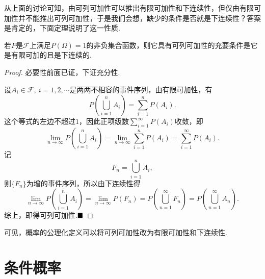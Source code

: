 从上面的讨论可知，由可列可加性可以推出有限可加性和下连续性，但仅由有限可加性并不能推出可列可加性，于是我们会想，缺少的条件是否就是下连续性？答案是肯定的，下面定理说明了这一性质.
\begin{theorem}
	若$P$是$\mathscr{F}$上满足$P(\varOmega)=1$的非负集合函数，则它具有可列可加性的充要条件是它是有限可加的且是下连续的.
\end{theorem}
\begin{proof}
	必要性前面已证，下证充分性.
	
	设$A_i\in\mathscr{F},\ i=1,2,\cdots$是两两不相容的事件序列，由有限可加性，有
	$$P\left(\bigcup_{i=1}^{n}A_i\right)=\sum_{i=1}^{n}P(A_i).$$
	这个等式的左边不超过$1$，因此正项级数$\sum\limits_{i=1}^{\infty}P(A_i)$收敛，即
	$$\lim\limits_{n\to\infty}P\left(\bigcup_{i=1}^{n}A_i\right)=\lim\limits_{n\to\infty}\sum_{i=1}^{n}P(A_i)=\sum_{i=1}^{\infty}P(A_i).$$
	记
	$$F_n=\bigcup_{i=1}^{n}A_i,$$
	则$\{F_n\}$为增的事件序列，所以由下连续性得
	$$\lim\limits_{n\to\infty}P\left(\bigcup_{i=1}^{n}A_i\right)=\lim\limits_{n\to\infty}P(F_n)=P\left(\bigcup_{n=1}^{\infty}F_n\right)=P\left(\bigcup_{n=1}^{\infty}A_n\right).$$
	综上，即得可列可加性.$\hfill\blacksquare$
\end{proof}
可见，概率的公理化定义可以将可列可加性改为有限可加性和下连续性.
\section{条件概率}
